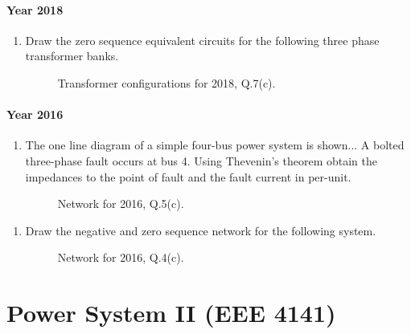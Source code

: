 \documentclass[12pt, a4paper]{article}
\begin{document}
	\subsection{Year 2018}
	\begin{enumerate}[label=\textbf{Q.7(c)}, wide, labelindent=0pt]
		\item Draw the zero sequence equivalent circuits for the following three phase transformer banks.
		\begin{figure}[h!]
			\centering
			\caption{Transformer configurations for 2018, Q.7(c).}
		\end{figure}
	\end{enumerate}
	
	
	\subsection{Year 2016}
	\begin{enumerate}[label=\textbf{Q.5(c)}, wide, labelindent=0pt]
		\item The one line diagram of a simple four-bus power system is shown... A bolted three-phase fault occurs at bus 4. Using Thevenin's theorem obtain the impedances to the point of fault and the fault current in per-unit.
		\begin{figure}[h!]
			\centering
			\caption{Network for 2016, Q.5(c).}
		\end{figure}
	\end{enumerate}
	
	\begin{enumerate}[label=\textbf{Q.4(c)}, wide, labelindent=0pt]
		\item Draw the negative and zero sequence network for the following system.
		\begin{figure}[h!]
			\centering
			\caption{Network for 2016, Q.4(c).}
		\end{figure}
	\end{enumerate}
	\newpage
	
	\part{Power System II (EEE 4141)}
	
\end{document}

